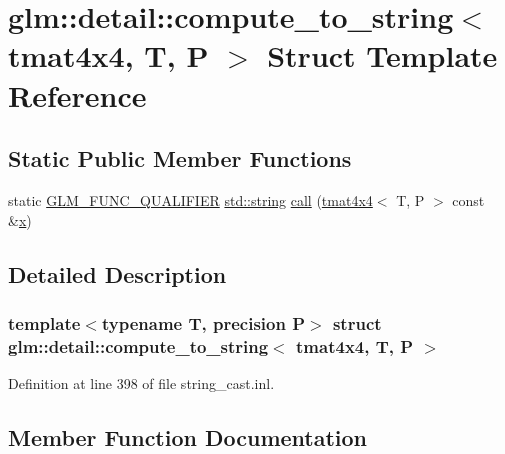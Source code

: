\hypertarget{structglm_1_1detail_1_1compute__to__string_3_01tmat4x4_00_01_t_00_01_p_01_4}{}\section{glm\+::detail\+::compute\+\_\+to\+\_\+string$<$ tmat4x4, T, P $>$ Struct Template Reference}
\label{structglm_1_1detail_1_1compute__to__string_3_01tmat4x4_00_01_t_00_01_p_01_4}
\subsection*{Static Public Member Functions}
\begin{DoxyCompactItemize}
\item 
static \mbox{\hyperlink{setup_8hpp_a33fdea6f91c5f834105f7415e2a64407}{G\+L\+M\+\_\+\+F\+U\+N\+C\+\_\+\+Q\+U\+A\+L\+I\+F\+I\+ER}} \mbox{\hyperlink{glad_8h_ac83513893df92266f79a515488701770}{std\+::string}} \mbox{\hyperlink{structglm_1_1detail_1_1compute__to__string_3_01tmat4x4_00_01_t_00_01_p_01_4_ac6e1968f8240ac2d9644216a7922bab2}{call}} (\mbox{\hyperlink{structglm_1_1tmat4x4}{tmat4x4}}$<$ T, P $>$ const \&\mbox{\hyperlink{glad_8h_a92d0386e5c19fb81ea88c9f99644ab1d}{x}})
\end{DoxyCompactItemize}


\subsection{Detailed Description}
\subsubsection*{template$<$typename T, precision P$>$\newline
struct glm\+::detail\+::compute\+\_\+to\+\_\+string$<$ tmat4x4, T, P $>$}



Definition at line 398 of file string\+\_\+cast.\+inl.



\subsection{Member Function Documentation}
\mbox{\label{structglm_1_1detail_1_1compute__to__string_3_01tmat4x4_00_01_t_00_01_p_01_4_ac6e1968f8240ac2d9644216a7922bab2}} 
